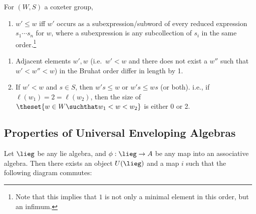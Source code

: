 \begin{proposition}

For \((W, S)\) a coxeter group,

\begin{enumerate}
\def\labelenumi{\alph{enumi}.}
\tightlist
\item
  \(w' \leq w\) iff \(w'\) occurs as a subexpression/subword of every
  reduced expression \(s_1 \cdots s_n\) for \(w\), where a subexpression
  is any subcollection of \(s_i\) in the same order.\footnote{Note that
    this implies that \(1\) is not only a minimal element in this order,
    but an infimum.}
\end{enumerate}

\begin{enumerate}
\def\labelenumi{\alph{enumi}.}
\setcounter{enumi}{1}
\item
  Adjacent elements \(w', w\) (i.e.~\(w' < w\) and there does not exist
  a \(w''\) such that \(w' < w'' < w\)) in the Bruhat order differ in
  length by 1.
\item
  If \(w' < w\) and \(s\in S\), then \(w' s \leq w\) or \(w's \leq ws\)
  (or both). i.e., if \(\ell(w_1) = 2 = \ell(w_2)\), then the size of
  \(\theset{w\in W \suchthat w_1 < w < w_2}\) is either 0 or 2.
\end{enumerate}


\end{proposition}

\hypertarget{properties-of-universal-enveloping-algebras}{%
\subsection{Properties of Universal Enveloping
Algebras}\label{properties-of-universal-enveloping-algebras}}

Let \(\lieg\) be any lie algebra, and \(\phi: \lieg \to A\) be any map
into an associative algebra. Then there exists an object \(U(\lieg)\)
and a map \(i\) such that the following diagram commutes:

\begin{center}\end{center}

